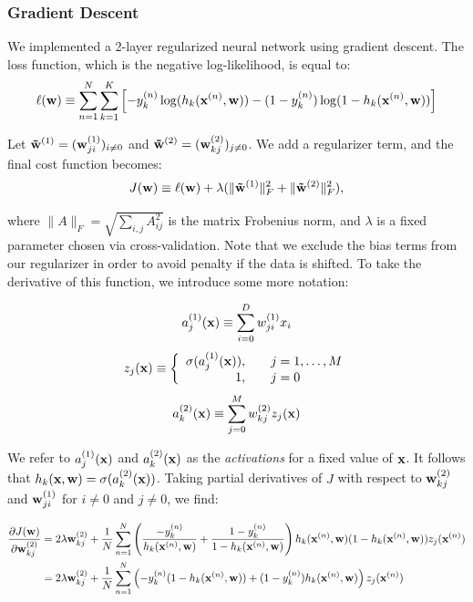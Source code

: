 \subsubsection{Gradient Descent}
We implemented a 2-layer regularized neural network using gradient descent.  The loss function, which is the negative log-likelihood, is equal to:
\begin{equation}
\ell(\boldsymbol{\mathbf{w}}) \equiv \sum_{n=1}^{N} \sum_{k=1}^{K} \left[ -y_k^{(n)} \log(h_{k}(\boldsymbol{\mathbf{x}}^{(n)}, \boldsymbol{\mathbf{w}})) - (1-y_k^{(n)}) \log(1 - h_{k}(\boldsymbol{\mathbf{x}}^{(n)}, \boldsymbol{\mathbf{w}}))\right]
\end{equation}

Let $\boldsymbol{\mathbf{\tilde w}}^{(1)} = (\boldsymbol{\mathbf{w}}^{(1)}_{ji})_{i \neq 0}$ and $\boldsymbol{\mathbf{\tilde w}}^{(2)} = (\boldsymbol{\mathbf{w}}^{(2)}_{kj})_{j \neq 0}$. We add a regularizer term, and the final cost function becomes:
\begin{equation}
J(\boldsymbol{\mathbf{w}}) \equiv \ell(\boldsymbol{\mathbf{w}}) + \lambda(\|\boldsymbol{\mathbf{\tilde w}}^{(1)}\|^2_F + \|\boldsymbol{\mathbf{\tilde w}}^{(2)}\|^2_F),
\end{equation}

where $\|A\|_F = \sqrt{\sum_{i,j} A^2_{ij}}$ is the matrix Frobenius norm, and $\lambda$ is a fixed parameter chosen via cross-validation.  Note that we exclude the bias terms from our regularizer in order to avoid penalty if the data is shifted.  To take the derivative of this function, we introduce some more notation:

\begin{equation}
a^{(1)}_j(\boldsymbol{\mathbf{x}}) \equiv \sum_{i=0}^D w_{ji}^{(1)} x_i
\end{equation}
\begin{equation}
z_j(\boldsymbol{\mathbf{x}}) \equiv \left\{\begin{array}{rl}
\sigma(a^{(1)}_j(\boldsymbol{\mathbf{x}})), & ~~~ j = 1,\ldots, M\\
1, & ~~~j = 0 \end{array} \right.
\end{equation}
\begin{equation}
a^{(2)}_k(\boldsymbol{\mathbf{x}}) \equiv \sum_{j=0}^M w_{kj}^{(2)} z_j(\boldsymbol{\mathbf{x}})
\end{equation}

We refer to $a^{(1)}_j(\boldsymbol{\mathbf{x}})$ and $a^{(2)}_k(\boldsymbol{\mathbf{x}})$ as the \emph{activations} for a fixed value of $\boldsymbol{\mathbf{x}}$.  It follows that $h_{k}(\boldsymbol{\mathbf{x}},\boldsymbol{\mathbf{w}}) = \sigma(a^{(2)}_k(\boldsymbol{\mathbf{x}}))$. Taking partial derivatives of $J$ with respect to $\boldsymbol{\mathbf{w}}^{(2)}_{kj}$ and $\boldsymbol{\mathbf{w}}^{(1)}_{ji}$ for $i \neq 0$ and $j \neq 0$, we find:  

\begin{align}
\frac{\partial J(\boldsymbol{\mathbf{w}})}{\partial \boldsymbol{\mathbf{w}}^{(2)}_{kj}} &= 2 \lambda \boldsymbol{\mathbf{w}}^{(2)}_{kj} + \frac{1}{N}\sum_{n=1}^{N} \left(\frac{-y_k^{(n)}}{h_k(\boldsymbol{\mathbf{x}}^{(n)},\boldsymbol{\mathbf{w}})} +  \frac{1-y_k^{(n)}}{1 - h_k(\boldsymbol{\mathbf{x}}^{(n)},\boldsymbol{\mathbf{w}})}\right) h_k(\boldsymbol{\mathbf{x}}^{(n)},\boldsymbol{\mathbf{w}}) (1 - h_k(\boldsymbol{\mathbf{x}}^{(n)},\boldsymbol{\mathbf{w}})) z_j(\boldsymbol{\mathbf{x}}^{(n)})\\
&= 2 \lambda \boldsymbol{\mathbf{w}}^{(2)}_{kj} +  \frac{1}{N}\sum_{n=1}^{N} \left(-y_k^{(n)}(1 - h_k(\boldsymbol{\mathbf{x}}^{(n)},\boldsymbol{\mathbf{w}})) + (1-y_k^{(n)})h_k(\boldsymbol{\mathbf{x}}^{(n)},\boldsymbol{\mathbf{w}}) \right) z_j(\boldsymbol{\mathbf{x}}^{(n)})
\end{align}

